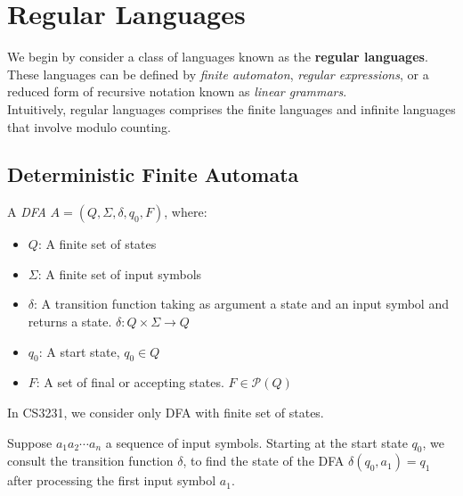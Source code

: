 \section{Regular Languages}
We begin by consider a class of languages known as the \textbf{regular
languages}. These languages can be defined by \textit{finite automaton},
\textit{regular expressions}, or a reduced form of recursive notation known as
\textit{linear grammars}.\\

Intuitively, regular languages comprises the finite languages and infinite
languages that involve modulo counting.

\subsection{Deterministic Finite Automata}
\begin{definition}[DFA]
  A \textit{DFA} $A = \left( Q,\Sigma,\delta,q_0,F \right) $, where:
  \begin{itemize}
    \item $Q$: A finite set of states
    \item $\Sigma$: A finite set of input symbols
    \item $\delta$: A transition function taking as argument a state and an
      input symbol and returns a state. $\delta: Q\times \Sigma\to Q$
    \item $q_0$: A start state, $q_0\in Q$
    \item $F$: A set of final or accepting states. $F\in \mathcal{P}\left( Q \right) $
  \end{itemize}
\end{definition}
\begin{remark}
  In CS3231, we consider only DFA with finite set of states.
\end{remark}
Suppose $a_1a_2\cdots a_{n}$ a sequence of input symbols. Starting at the start
state $q_0$, we consult the transition function $\delta$, to find the state of
the DFA $\delta\left( q_0,a_1 \right) =q_1$ after processing the first input
symbol $a_1$.
